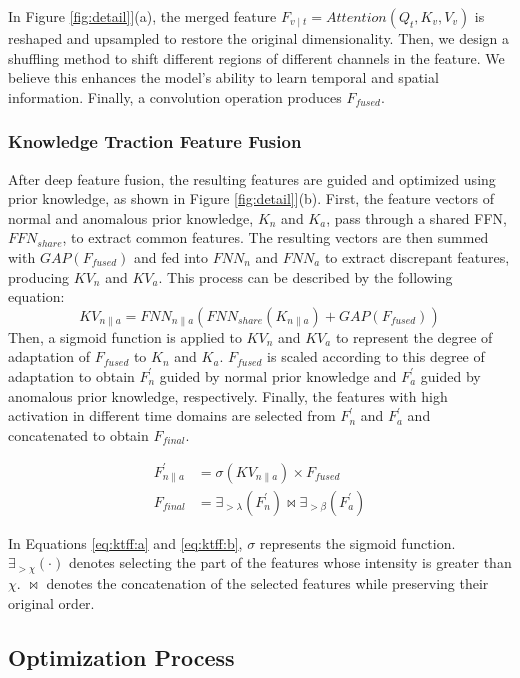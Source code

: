 In Figure \ref{fig:detail}](a), the merged feature $F_{v \mid t} =Attention(Q_{t},K_{v},V_{v})$ is reshaped and upsampled to restore the original dimensionality. Then, we design a shuffling method to shift different regions of different channels in the feature. We believe this enhances the model's ability to learn temporal and spatial information. Finally, a convolution operation produces $F_{fused}$.
\subsubsection{Knowledge Traction Feature Fusion}

After deep feature fusion, the resulting features are guided and optimized using prior knowledge, as shown in Figure \ref{fig:detail}](b). First, the feature vectors of normal and anomalous prior knowledge, $K_{n}$ and $K_{a}$, pass through a shared FFN, $FFN_{share}$, to extract common features. The resulting vectors are then summed with $GAP(F_{fused})$ and fed into $FNN_{n}$ and $FNN_{a}$ to extract discrepant features, producing $KV_{n}$ and $KV_{a}$. This process can be described by the following equation: $$KV_{n \parallel a } = FNN_{n \parallel a}(FNN_{share}(K_{n \parallel a}) + GAP(F_{fused}))$$ Then, a sigmoid function is applied to $KV_{n}$ and $KV_{a}$ to represent the degree of adaptation of $F_{fused}$ to $K_{n}$ and $K_{a}$. $F_{fused}$ is scaled according to this degree of adaptation to obtain $F_{n}^{'}$ guided by normal prior knowledge and $F_{a}^{'}$ guided by anomalous prior knowledge, respectively. Finally, the features with high activation in different time domains are selected from $F_{n}^{'}$ and $F_{a}^{'}$ and concatenated to obtain $F_{final}$.

\begin{align}
\label{eq:ktff:a}
F_{n \parallel a}^{'} &= \sigma (KV_{n \parallel a}) \times F_{fused} \\ 
\label{eq:ktff:b}
F_{final} &= \exists_{>\lambda }(F_{n}^{'}) \Join  \exists_{>\beta }(F_{a}^{'}) 
\end{align}

In Equations \ref{eq:ktff:a} and \ref{eq:ktff:b}, $\sigma$ represents the sigmoid function. $\exists_{>\chi}(\cdot)$ denotes selecting the part of the features whose intensity is greater than $\chi$. $\Join$ denotes the concatenation of the selected features while preserving their original order.

\subsection{Optimization Process}

